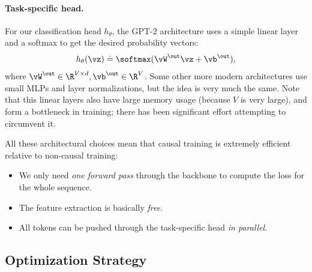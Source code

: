 \documentclass[../../book-main.tex]{subfiles}
\begin{document}
\paragraph{Task-specific head.} For our classification head
\(h_{\theta}\), the GPT-2 architecture uses a simple linear layer and
a softmax to get the desired probability vectors:
\begin{equation}
h_{\theta}(\vz) \doteq \softmax(\vW^{\out}\vz + \vb^{\out}),
\end{equation}
where \(\vW^{\out} \in \R^{V \times d}, \vb^{\out} \in \R^{V}\). Some
other more modern architectures use small MLPs and layer
normalizations, but the idea is very much the same. Note that this
linear layers also have large memory usage (because \(V\) is very
large), and form a bottleneck in training; there has been significant
effort attempting to circumvent it.

All these architectural choices mean that causal training is
extremely efficient relative to non-causal training:
\begin{itemize}
\item We only need \textit{one forward pass} through the backbone to
compute the loss for the whole sequence.
\item The feature extraction is basically \textit{free}.
\item All tokens can be pushed through the task-specific head
\textit{in parallel}.
\end{itemize}

\subsection{Optimization Strategy}
\end{document}
